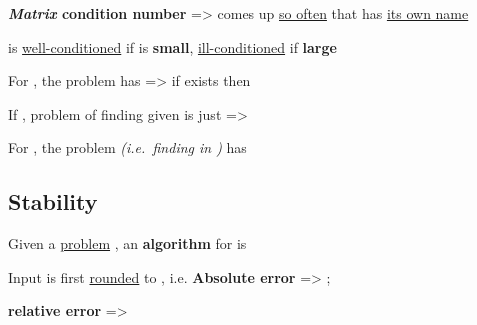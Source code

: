 \textbf{\emph{Matrix} condition number} 
=> comes up \ul{so often} that has \ul{its own name}
\begin{itemize}
      \vItem
             is \ul{well-conditioned} if
             is \textbf{small}, \ul{ill-conditioned} if
            \textbf{large}
      \vItem
\end{itemize}

\hSep %

For , the problem
 has
 => if
 exists then 

\begin{itemize}

      \vItem
            If , problem of finding  given  is
            just  =>
\end{itemize}

For , the problem
 \emph{(i.e.~finding
       in )} has


\subsection*{Stability}

Given a \ul{problem} , an \textbf{algorithm} for
 is 

\begin{itemize}
      \vItem
            Input  is first \ul{rounded} to ,
            i.e. 
      \vItem
            \textbf{Absolute error} => ;

            \textbf{relative error} => 
\end{itemize}

